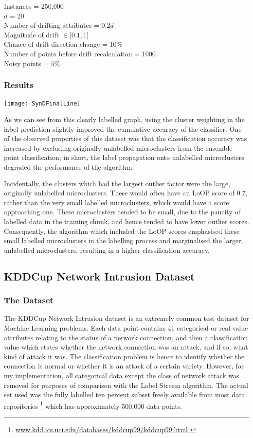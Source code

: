 \documentclass[12pt,a4paper,oneside]{report}
\begin{document}
Instances = 250,000\\
\(d\) = 20 \\
Number of drifting attributes = \(0.2d\)\\
Magnitude of drift \(\in \lbrack 0.1,1\rbrack \) \\
Chance of drift direction change = \(10 \% \) \\
Number of points before drift recalculation  = 1000\\
Noisy points = \(5\% \)
\subsubsection{Results}

\texttt{[image: SynDFinalLine]}

As we can see from this clearly labelled graph, using the cluster weighting in the label prediction slightly improved the cumulative accuracy of the classifier.  One of the observed properties of this dataset was that the classification accuracy was increased by excluding originally unlabelled microclusters from the ensemble point classification; in short, the label propagation onto unlabelled microclusters degraded the performance of the algorithm. 

Incidentally, the clusters which had the largest outlier factor were the large, originally unlabelled microclusters. These would often have an LoOP score of 0.7, rather than the very small labelled microclusters, which would have a score approaching one. These microclusters tended to be small, due to the paucity of labelled data in the training chunk, and hence tended to have lower outlier scores. Consequently, the algorithm which included the LoOP scores emphasised these small labelled microclusters in the labelling process and marginalised the larger, unlabelled microclusters, resulting in a higher classification accuracy. 

\subsection{KDDCup Network Intrusion Dataset}
\subsubsection{The Dataset}

The KDDCup Network Intrusion dataset is an extremely common test dataset for Machine Learning problems. Each data point contains 41 categorical or real value attributes relating to the status of a network connection, and then a classification value which states whether the network connection was an attack, and if so, what kind of attack it was. The classification problem is hence to identify whether the connection is normal or whether it is an attack of a certain variety. However, for my implementation, all categorical data except the class of network attack was removed for purposes of comparison with the Label Stream algorithm. The actual set used was the fully labelled ten percent subset freely available from most data repositories \footnote{\url{ www.kdd.ics.uci.edu/databases/kddcup99/kddcup99.html } } which has approximately 500,000 data points.    
\end{document}
